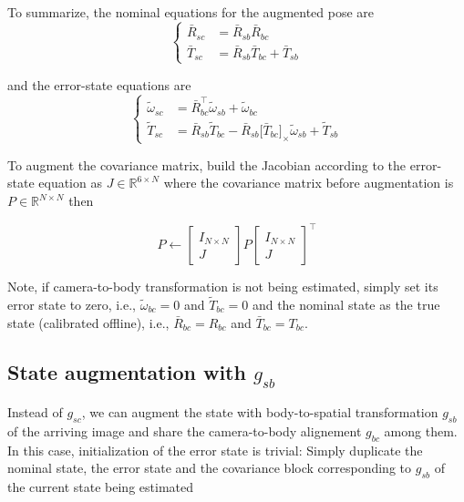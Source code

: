 \documentclass[letter,10pt]{article}
\newcommand{\real}{\mathbb{R}}
\newcommand{\asym}[1]{{\lbrack #1\rbrack}_\times{}}
\begin{document}
To summarize, the nominal equations for the augmented pose are
\begin{equation}
\begin{cases}
\bar R_{sc} &= \bar R_{sb} \bar R_{bc} \\
 \bar T_{sc} &= \bar R_{sb} \bar T_{bc} + \bar T_{sb}
\end{cases}
\end{equation}

and the error-state equations are
\begin{equation}
\begin{cases}
\tilde \omega_{sc} &= \bar R_{bc}^\top \tilde \omega_{sb} + \tilde \omega_{bc} \\
 \tilde T_{sc} &= \bar R_{sb} \tilde T_{bc} - \bar R_{sb} \asym{\bar T_{bc}} \tilde \omega_{sb} + \tilde T_{sb}
\end{cases}
\end{equation}

To augment the covariance matrix, build the Jacobian according to the error-state equation as $J \in \real^{6\times N}$ where the covariance matrix before augmentation is $P \in \real^{N\times N}$ then

\begin{equation}
 P \leftarrow 
 \begin{bmatrix}
  I_{N\times N}\\
  J
 \end{bmatrix}
 P
 \begin{bmatrix}
 I_{N\times N}\\
 J
 \end{bmatrix}^\top
\end{equation}

Note, if camera-to-body transformation is not being estimated, simply set its error state  to zero, i.e., $\tilde \omega_{bc}=0$ and $\tilde T_{bc}=0$ and the nominal state as the true state (calibrated offline), i.e., $\bar R_{bc}=R_{bc}$ and $\bar T_{bc}=T_{bc}$.

\subsection{State augmentation with $g_{sb}$}

Instead of $g_{sc}$, we can augment the state with body-to-spatial transformation $g_{sb}$ of the arriving image and share the camera-to-body alignement $g_{bc}$  among them. In this case, initialization of the error state is trivial: Simply duplicate the nominal state, the error state and the covariance block corresponding to $g_{sb}$ of the current state being estimated
\end{document}
